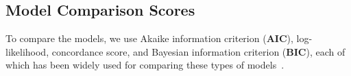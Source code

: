 \subsection{Model Comparison Scores}

To compare the models, we use Akaike information criterion (\textbf{AIC}), log-likelihood, concordance score, and Bayesian information criterion (\textbf{BIC}), each of which has been widely used for comparing these types of models~\citep{}. 







